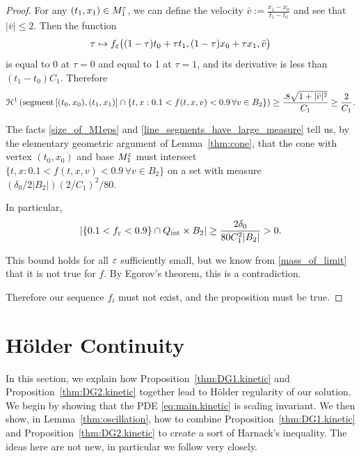 \begin{proof}
For any $(t_1,x_1) \in M_1^\varepsilon$, we can define the velocity $\bar{v} := \frac{x_1-x_0}{t_1-t_0}$ and see that $|\bar{v}| \leq 2$.  Then the function
\[ \tau \mapsto f_\varepsilon\big((1-\tau)t_0 + \tau t_1, (1-\tau)x_0 + \tau x_1, \bar{v}\big) \]
is equal to 0 at $\tau = 0$ and equal to 1 at $\tau = 1$, and its derivative is less than $(t_1-t_0) C_1$.  Therefore
\begin{equation}\label{line_segments_have_large_measure}
\mathcal{H}^1\left( \textrm{segment}\left[ (t_0,x_0),(t_1,x_1) \right] \cap \{t,x: 0.1 < f(t,x,v) < 0.9 \, \forall v\in B_2\} \right) \geq \frac{.8 \sqrt{1 + |\bar{v}|^2}}{C_1} \geq \frac{2}{C_1}. 
\end{equation}

The facts \eqref{size_of_M1eps} and \eqref{line_segments_have_large_measure} tell us, by the elementary geometric argument of Lemma~\ref{thm:cone}, that the cone with vertex $(t_0,x_0)$ and base $M_1^\varepsilon$ must intersect $\{t,x: 0.1 < f(t,x,v) < 0.9 \, \forall v\in B_2\}$ on a set with measure $(\delta_0/2|B_2|)(2/C_1)^2/80$.  

In particular,
\[ \left\lvert \{0.1<f_\varepsilon<0.9\} \cap {Q_\textrm{int}} \times B_2 \right\rvert \geq \frac{2\delta_0}{80 C_1^2|B_2|} > 0. \]


This bound holds for all $\varepsilon$ sufficiently small, but we know from \eqref{mass_of_limit} that it is not true for $f$.  By Egorov's theorem, this is a contradiction.  

Therefore our sequence $f_i$ must not exist, and the proposition must be true.  

\end{proof}







\section{H\"{o}lder Continuity}\label{sec:Holder}

In this section, we explain how Proposition~\ref{thm:DG1.kinetic} and Proposition~\ref{thm:DG2.kinetic} together lead to H\"{o}lder regularity of our solution.  We begin by showing that the PDE \eqref{eq:main.kinetic} is scaling invariant.  We then show, in Lemma~\ref{thm:oscillation}, how to combine Proposition~\ref{thm:DG1.kinetic} and Proposition~\ref{thm:DG2.kinetic} to create a sort of Harnack's inequality.  The ideas here are not new, in particular we follow \cite{CaChVa} very closely.  

